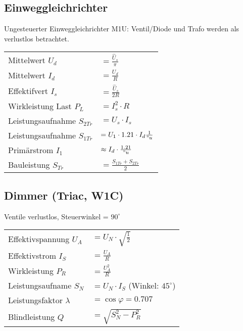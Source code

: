 \subsection{Einweggleichrichter}
\begin{multicols}{2}
Ungesteuerter Einweggleichrichter M1U: \newline
Ventil/Diode und Trafo werden als verlustlos betrachtet.

\renewcommand{\arraystretch}{1.5}
\begin{tabular}{ll}
	Mittelwert $U_d$ 			& $ = \frac{\hat{U}_s}{\pi}$ \\
	Mittelwert $I_d$ 			& $ = \frac{U_d}{R}$ \\
	Effektifvert $I_s$			& $ = \frac{\hat{U}_s}{2R}$ \\
	Wirkleistung Last $P_L$		& $ = I_s^2 \cdot R$ \\
	Leistungsaufnahme $S_{2Tr}$	& $ = U_s \cdot I_s$ \\
	Leistungsaufnahme $S_{1Tr}$	& $ = U_1 \cdot 1.21 \cdot I_d \frac{1}{"u}$ \\
	Primärstrom $I_1$			& $ \approx I_d \cdot \frac{1.21}{"u} $ \\
	Bauleistung $S_{Tr}$		& $ = \frac{S_{1Tr} + S_{2Tr}}{2}$
\end{tabular}
\end{multicols}


\subsection{Dimmer (Triac, W1C)}
\begin{multicols}{2}
Ventile verlustlos, Steuerwinkel = $90^\circ$ \newline
{}

 \begin{tabular}{ll}
 	Effektivspannung $U_A$		& $ = U_N \cdot \sqrt{\frac{1}{2}}$ \\
 	Effektivstrom $I_S$			& $ = \frac{U_A}{R}$ \\
 	Wirkleistung $P_R$			& $ = \frac{U_A^2}{R} $ \\
 	Leistungsaufname $S_N$		& $ = U_N \cdot I_S $ (Winkel: $45^\circ$) \\
 	Leistungsfaktor $\lambda$	& $ = \cos \varphi = 0.707 $\\
 	Blindleistung $Q$			& $ = \sqrt{S_N^2 -P_R^2}$\\
 \end{tabular}
 \end{multicols}

